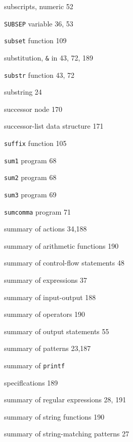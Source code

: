 \begin{multicols}{3}
\hangindent=3pc  subscripts, numeric 52

\hangindent=3pc  \verb'SUBSEP' variable 36, 53

\hangindent=3pc  \verb'subset' function 109

\hangindent=3pc  substitution, \verb'&' in 43, 72, 189

\hangindent=3pc  \verb'substr' function 43, 72

\hangindent=3pc  substring 24

\hangindent=3pc  successor node 170

\hangindent=3pc  successor-list data structure 171

\hangindent=3pc  \verb'suffix' function 105







\hangindent=3pc  \verb'sum1' program 68

\hangindent=3pc  \verb'sum2' program 68

\hangindent=3pc  \verb'sum3' program 69

\hangindent=3pc  \verb'sumcomma' program 71

\hangindent=3pc  summary of actions 34,188

\hangindent=3pc  summary of arithmetic functions 190

\hangindent=3pc  summary of control-flow statements 48

\hangindent=3pc  summary of expressions 37

\hangindent=3pc  summary of input-output 188

\hangindent=3pc  summary of operators 190

\hangindent=3pc  summary of output statements 55

\hangindent=3pc  summary of patterns 23,187

\hangindent=3pc  summary of \verb'printf'

\hangindent=3pc  speciflcations 189

\hangindent=3pc  summary of regular expressions 28, 191

\hangindent=3pc  summary of string functions 190

\hangindent=3pc  summary of string-matching patterns 27


\end{multicols}
